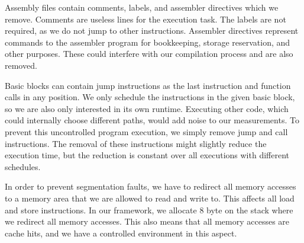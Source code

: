 Assembly files contain comments, labels, and assembler directives which we remove.
Comments are useless lines for the execution task. 
The labels are not required, as we do not jump to other instructions.
Assembler directives represent commands to the assembler program for bookkeeping, storage reservation, and other purposes.
These could interfere with our compilation process and are also removed.

Basic blocks can contain jump instructions as the last instruction and function calls in any position.
We only schedule the instructions in the given basic block, so we are also only interested in its own runtime.
Executing other code, which could internally choose different paths, would add noise to our measurements.
To prevent this uncontrolled program execution, we simply remove jump and call instructions.
The removal of these instructions might slightly reduce the execution time, but the reduction is constant over all executions with different schedules.

In order to prevent segmentation faults, we have to redirect all memory accesses to a memory area that we are allowed to read and write to.
This affects all load and store instructions.
In our framework, we allocate 8 byte on the stack where we redirect all memory accesses.
This also means that all memory accesses are cache hits, and we have a controlled environment in this aspect.

